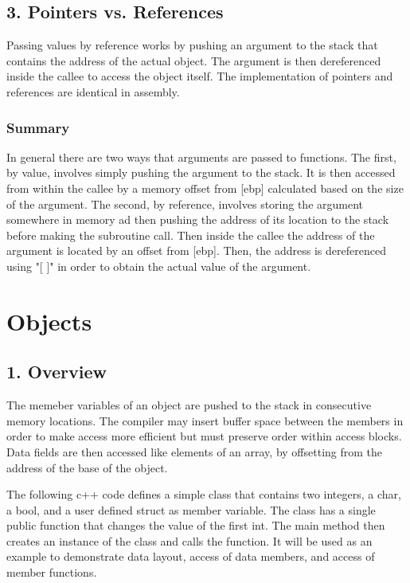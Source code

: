 \documentclass{article}
\begin{document}
\subsection*{3. Pointers vs. References}
Passing values by reference works by pushing an argument to the stack that contains the address of the actual object. The argument is then dereferenced inside the callee to access the object itself. The implementation of pointers and references are identical in assembly. 

\subsubsection*{Summary}
In general there are two ways that arguments are passed to functions. The first, by value, involves simply pushing the argument to the stack. It is then accessed from within the callee by a memory offset from [ebp] calculated based on the size of the argument. The second, by reference, involves storing the argument somewhere in memory ad then pushing the address of its location to the stack before making the subroutine call. Then inside the callee the address of the argument is located by an offset from [ebp]. Then, the address is dereferenced using "[ ]" in order to obtain the actual value of the argument.

\section*{Objects}
\subsection*{1. Overview}
The memeber variables of an object are pushed to the stack in consecutive memory locations. The compiler may insert buffer space between the members in order to make access more efficient but must preserve order within access blocks. Data fields are then accessed like elements of an array, by offsetting from the address of the base of the object.

The following c++ code defines a simple class that contains two integers, a char, a bool, and a user defined struct as member variable. The class has a single public function that changes the value of the first int. The main method then creates an instance of the class and calls the function. It will be used as an example to demonstrate data layout, access of data members, and access of member functions.
\end{document}
